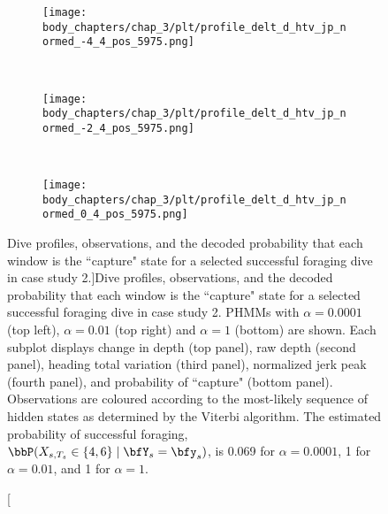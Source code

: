 \begin{figure}
    \centering
    \begin{subfigure}[t]{0.45\textwidth}
        \centering
        \texttt{[image: body\_chapters/chap\_3/plt/profile\_delt\_d\_htv\_jp\_normed\_-4\_4\_pos\_5975.png]}
    \end{subfigure}
    ~
    \begin{subfigure}[t]{0.45\textwidth}
        \centering
        \texttt{[image: body\_chapters/chap\_3/plt/profile\_delt\_d\_htv\_jp\_normed\_-2\_4\_pos\_5975.png]}
    \end{subfigure}
    \\
    \begin{subfigure}[t]{0.8\textwidth}
        \centering
        \texttt{[image: body\_chapters/chap\_3/plt/profile\_delt\_d\_htv\_jp\_normed\_0\_4\_pos\_5975.png]}
    \end{subfigure}
    \caption[Dive profiles, observations, and the decoded probability that each window is the ``capture" state for a selected successful foraging dive in case study 2.]{Dive profiles, observations, and the decoded probability that each window is the ``capture" state for a selected successful foraging dive in case study 2. PHMMs with $\alpha = 0.0001$ (top left), $\alpha = 0.01$ (top right) and $\alpha = 1$ (bottom) are shown. Each subplot displays change in depth (top panel), raw depth (second panel), heading total variation (third panel), normalized jerk peak (fourth panel), and probability of ``capture" (bottom panel). Observations are coloured according to the most-likely sequence of hidden states as determined by the Viterbi algorithm. The estimated probability of successful foraging, $\bbP(X_{s,T_s} \in \{4,6\} \mid \bfY_s = \bfy_s)$, is 0.069 for $\alpha = 0.0001$, 1 for $\alpha = 0.01$, and 1 for $\alpha = 1$.}
    \label{fig:profiles_5975}
\end{figure}

